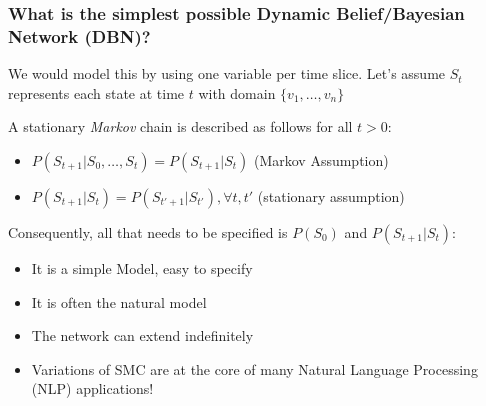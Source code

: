 \documentclass{article}
\begin{document}
\subsubsection*{What is the simplest possible Dynamic Belief/Bayesian Network (DBN)?}
We would model this by using one variable per time slice. Let's assume $ S_t $ represents each state at time $ t $ with domain $ \{v_1, \dots, v_n\} $
\begin{center}
\end{center}
A stationary \textit{Markov} chain is described as follows for all $ t > 0 $:
\begin{itemize}
	\item $ P(S_{t+1}| S_0, \dots , S_t) = P(S_{t+1}| S_t)$ (Markov Assumption)
	\item $ P(S_{t+1}| S_t) = P(S_{t'+1}| S_{t'}), \forall t, t' $ (stationary assumption)
\end{itemize}
Consequently, all that needs to be specified is $ P(S_0) $ and $ P(S_{t+1}| S_t) $:
\begin{itemize}
	\item It is a simple Model, easy to specify
	\item It is often the natural model
	\item The network can extend indefinitely
	\item Variations of SMC are at the core of many Natural Language Processing (NLP) applications!
\end{itemize}
\end{document}
